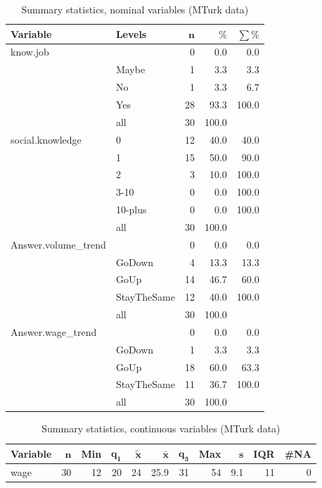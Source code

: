 \documentclass[a4paper,10pt]{article}\usepackage[]{graphicx}\usepackage[]{color}
\begin{document}
\begin{table}[ht]
\centering
{\footnotesize
\begin{tabular}{ll|rrr}
 \textbf{Variable} & \textbf{Levels} & $\mathbf{n}$ & $\mathbf{\%}$ & $\mathbf{\sum \%}$ \\ 
  \hline
know.job &  & 0 & 0.0 & 0.0 \\ 
   & Maybe & 1 & 3.3 & 3.3 \\ 
   & No & 1 & 3.3 & 6.7 \\ 
   & Yes & 28 & 93.3 & 100.0 \\ 
   \hline
 & all & 30 & 100.0 &  \\ 
   \hline
\hline
social.knowledge & 0 & 12 & 40.0 & 40.0 \\ 
   & 1 & 15 & 50.0 & 90.0 \\ 
   & 2 & 3 & 10.0 & 100.0 \\ 
   & 3-10 & 0 & 0.0 & 100.0 \\ 
   & 10-plus & 0 & 0.0 & 100.0 \\ 
   \hline
 & all & 30 & 100.0 &  \\ 
   \hline
\hline
Answer.volume\_trend &  & 0 & 0.0 & 0.0 \\ 
   & GoDown & 4 & 13.3 & 13.3 \\ 
   & GoUp & 14 & 46.7 & 60.0 \\ 
   & StayTheSame & 12 & 40.0 & 100.0 \\ 
   \hline
 & all & 30 & 100.0 &  \\ 
   \hline
\hline
Answer.wage\_trend &  & 0 & 0.0 & 0.0 \\ 
   & GoDown & 1 & 3.3 & 3.3 \\ 
   & GoUp & 18 & 60.0 & 63.3 \\ 
   & StayTheSame & 11 & 36.7 & 100.0 \\ 
   \hline
 & all & 30 & 100.0 &  \\ 
   \hline
\hline
\end{tabular}
}
\caption{Summary statistics, nominal variables (MTurk data)} 
\label{tab1:47-2110}
\end{table}
\begin{table}[ht]
\centering
{\footnotesize
\begin{tabular}{lrrrrrrrrrr}
 \textbf{Variable} & $\mathbf{n}$ & \textbf{Min} & $\mathbf{q_1}$ & $\mathbf{\widetilde{x}}$ & $\mathbf{\bar{x}}$ & $\mathbf{q_3}$ & \textbf{Max} & $\mathbf{s}$ & \textbf{IQR} & \textbf{\#NA} \\ 
  \hline
wage & 30 & 12 & 20 & 24 & 25.9 & 31 & 54 & 9.1 & 11 & 0 \\ 
  \end{tabular}
}
\caption{Summary statistics, continuous variables (MTurk data)} 
\label{tab2:47-2110}
\end{table}
\end{document}
